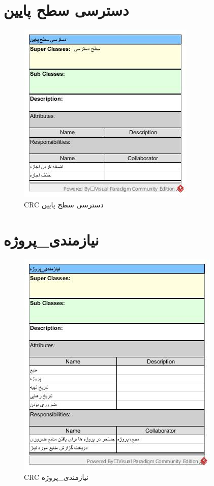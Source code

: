 \section{‌دسترسی سطح پایین}
\begin{figure}[H]
	\centering
	\includegraphics[scale=1]{img/crc/LowAccess}
	\caption{CRC دسترسی سطح پایین }
\end{figure}

\section{‌نیازمندی\_پروژه}
\begin{figure}[H]
	\centering
	\includegraphics[scale=1]{img/crc/ProjectRequirement}
	\caption{CRC نیازمندی\_پروژه }
\end{figure}

